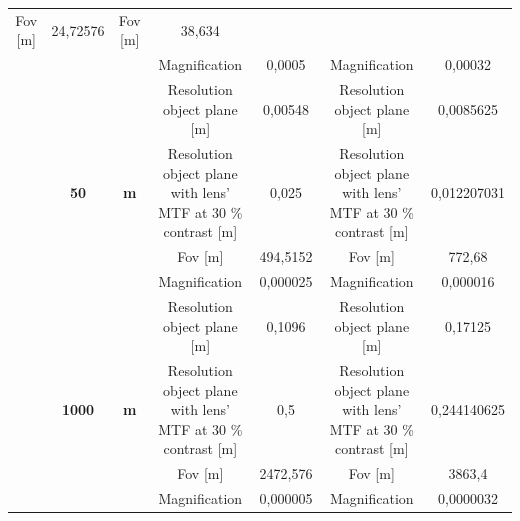\begin{table}[H]
{\begin{tabular}{ccc|cc|cc|}
  \cellcolor[HTML]{EFEFEF}Fov {[}m{]} &
  \cellcolor[HTML]{EFEFEF}24,72576 &
  \cellcolor[HTML]{EFEFEF}Fov {[}m{]} &
  \cellcolor[HTML]{EFEFEF}38,634 \\
\multicolumn{1}{|c|}{} &
  \cellcolor[HTML]{EFEFEF} &
  \cellcolor[HTML]{EFEFEF} &
  Magnification &
  0,0005 &
  Magnification &
  0,00032 \\
\multicolumn{1}{|c|}{} &
  \cellcolor[HTML]{EFEFEF} &
  \cellcolor[HTML]{EFEFEF} &
  \cellcolor[HTML]{EFEFEF}Resolution object plane {[}m{]} &
  \cellcolor[HTML]{EFEFEF}0,00548 &
  \cellcolor[HTML]{EFEFEF}Resolution object plane {[}m{]} &
  \cellcolor[HTML]{EFEFEF}0,0085625 \\
\multicolumn{1}{|c|}{} &
  \multirow{-4}{*}{\cellcolor[HTML]{EFEFEF}\textbf{50}} &
  \multirow{-4}{*}{\cellcolor[HTML]{EFEFEF}\textbf{m}} &
  Resolution object plane with lens' MTF at 30 \% contrast {[}m{]} &
  0,025 &
  Resolution object plane with lens' MTF at 30 \% contrast {[}m{]} &
  0,012207031 \\ \cline{2-7} 
\multicolumn{1}{|c|}{} &
  \cellcolor[HTML]{EFEFEF} &
  \cellcolor[HTML]{EFEFEF} &
  \cellcolor[HTML]{EFEFEF}Fov {[}m{]} &
  \cellcolor[HTML]{EFEFEF}494,5152 &
  \cellcolor[HTML]{EFEFEF}Fov {[}m{]} &
  \cellcolor[HTML]{EFEFEF}772,68 \\
\multicolumn{1}{|c|}{} &
  \cellcolor[HTML]{EFEFEF} &
  \cellcolor[HTML]{EFEFEF} &
  Magnification &
  0,000025 &
  Magnification &
  0,000016 \\
\multicolumn{1}{|c|}{} &
  \cellcolor[HTML]{EFEFEF} &
  \cellcolor[HTML]{EFEFEF} &
  \cellcolor[HTML]{EFEFEF}Resolution object plane {[}m{]} &
  \cellcolor[HTML]{EFEFEF}0,1096 &
  \cellcolor[HTML]{EFEFEF}Resolution object plane {[}m{]} &
  \cellcolor[HTML]{EFEFEF}0,17125 \\
\multicolumn{1}{|c|}{} &
  \multirow{-4}{*}{\cellcolor[HTML]{EFEFEF}\textbf{1000}} &
  \multirow{-4}{*}{\cellcolor[HTML]{EFEFEF}\textbf{m}} &
  Resolution object plane with lens' MTF at 30 \% contrast {[}m{]} &
  0,5 &
  Resolution object plane with lens' MTF at 30 \% contrast {[}m{]} &
  0,244140625 \\ \cline{2-7} 
\multicolumn{1}{|c|}{} &
  \cellcolor[HTML]{EFEFEF} &
  \cellcolor[HTML]{EFEFEF} &
  \cellcolor[HTML]{EFEFEF}Fov {[}m{]} &
  \cellcolor[HTML]{EFEFEF}2472,576 &
  \cellcolor[HTML]{EFEFEF}Fov {[}m{]} &
  \cellcolor[HTML]{EFEFEF}3863,4 \\
\multicolumn{1}{|c|}{} &
  \cellcolor[HTML]{EFEFEF} &
  \cellcolor[HTML]{EFEFEF} &
  Magnification &
  0,000005 &
  Magnification &
  0,0000032 \\

\end{tabular}}
\end{table}
